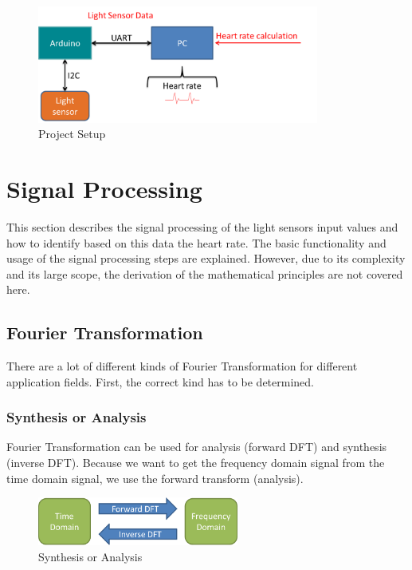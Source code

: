 \documentclass[notitlepage]{scrreprt}
\begin{document}
\begin{figure}[H]
	\centering
	\includegraphics[width=350px]{images/general_dataFlow_second.png}
	\caption{Project Setup}
	\label{fig:data-flow2}
\end{figure}

\section{Signal Processing}
\label{sec:signal-processing}
This section describes the signal processing of the light sensors input values and how to identify based on this data the heart rate. The basic functionality and usage of the signal processing steps are explained. However, due to its complexity and its large scope, the derivation of the mathematical principles are not covered here.

\subsection{Fourier Transformation}
There are a lot of different kinds of Fourier Transformation for different application fields. First, the correct kind has to be determined.

\subsubsection{Synthesis or Analysis}
Fourier Transformation can be used for analysis (forward DFT) and synthesis (inverse DFT). Because we want to get the frequency domain signal from the time domain signal, we use the forward transform (analysis).

\begin{figure}[H]
	\centering
	\includegraphics[width=250px]{images/DFT_types1.png}
	\caption{Synthesis or Analysis}
	\label{fig:dft-types1}
\end{figure}
\end{document}
